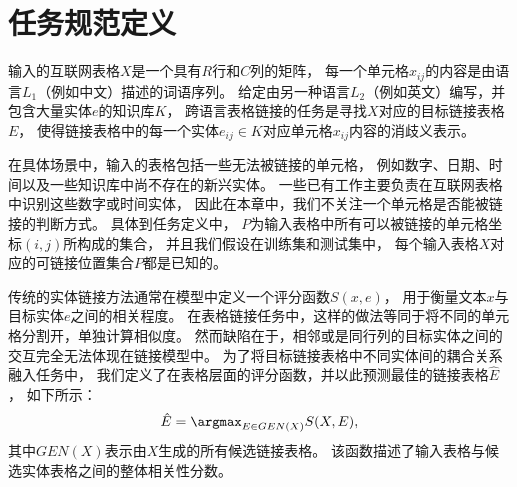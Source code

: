 
\section{任务规范定义}
\label{sec:tabel-problem}



输入的互联网表格$X$是一个具有$R$行和$C$列的矩阵，
每一个单元格$x_{ij}$的内容是由语言$L_1$（例如中文）描述的词语序列。
给定由另一种语言$L_2$（例如英文）编写，并包含大量实体$e$的知识库$K$，
跨语言表格链接的任务是寻找$X$对应的目标链接表格$E$，
使得链接表格中的每一个实体$e_{ij} \in K$对应单元格$x_{ij}$内容的消歧义表示。

在具体场景中，输入的表格包括一些无法被链接的单元格，
例如数字、日期、时间以及一些知识库中尚不存在的新兴实体。
一些已有工作\cite{ibrahim2016making}主要负责在互联网表格中识别这些数字或时间实体，
因此在本章中，我们不关注一个单元格是否能被链接的判断方式。
具体到任务定义中，
$P$为输入表格中所有可以被链接的单元格坐标$(i, j)$所构成的集合，
并且我们假设在训练集和测试集中，
每个输入表格$X$对应的可链接位置集合$P$都是已知的。

传统的实体链接方法通常在模型中定义一个评分函数$S(x, e)$，
用于衡量文本$x$与目标实体$e$之间的相关程度。
在表格链接任务中，这样的做法等同于将不同的单元格分割开，单独计算相似度。
然而缺陷在于，相邻或是同行列的目标实体之间的交互完全无法体现在链接模型中。
为了将目标链接表格中不同实体间的耦合关系融入任务中，
我们定义了在表格层面的评分函数，并以此预测最佳的链接表格$\hat{E}$，
如下所示：%
\begin{equation}
  \label{eqn:joint-score}
  \hat{E} = \argmax_{E \in GEN(X)} S(X,E),
\end{equation}
\noindent
其中$GEN(X)$表示由$X$生成的所有候选链接表格。
该函数描述了输入表格与候选实体表格之间的整体相关性分数。
